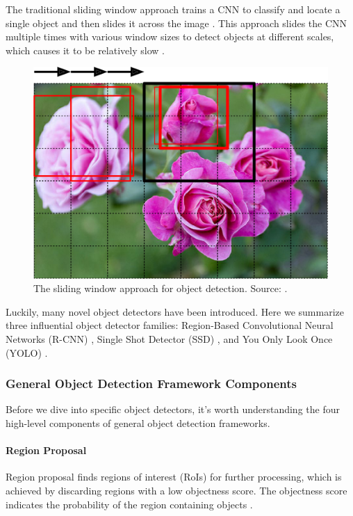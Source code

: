 \documentclass[a4paper, 11pt, oneside]{article}
\begin{document}
The traditional sliding window approach trains a CNN to classify and locate a single object and then slides it
across the image \cite{geron2019hands, girshick2014rich, pasquet2017amphora, redmon2016you}. This approach slides the
CNN multiple times with various window sizes to detect objects at different scales, which causes it to be relatively slow
\cite{geron2019hands}.

\begin{figure}[ht]
  \begin{center}
    \includegraphics[width=.5\textwidth]{sliding_window.png}
  \end{center}
  \caption{The sliding window approach for object detection. Source: \cite{o2019deep}.}
\end{figure}

Luckily, many novel object detectors have been introduced. Here we summarize three influential object detector families:
Region-Based Convolutional Neural Networks (R-CNN) \cite{girshick2014rich, girshick2015fast, ren2015faster}, Single Shot
Detector (SSD) \cite{liu2016ssd}, and You Only Look Once (YOLO)
\cite{redmon2016you, redmon2017yolo9000, redmon2018yolov3, bochkovskiy2020yolov4, yolov5}.

\subsubsection{General Object Detection Framework Components}

\label{sec:generalobjectdetection}

Before we dive into specific object detectors, it's worth understanding the four high-level components of
general object detection frameworks.

\paragraph{Region Proposal}

Region proposal finds regions of interest (RoIs) for further processing, which is achieved by discarding regions with a
low objectness score. The objectness score indicates the probability of the region containing objects
\cite{alexe2012measuring}.
\end{document}
